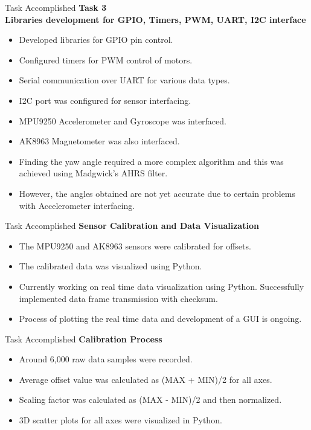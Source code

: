 \documentclass[10pt, a4paper]{beamer}
\begin{document}
\begin{frame}{Task Accomplished}
\bfseries Task 3\\ Libraries development for GPIO, Timers, PWM, UART, I2C interface\\
\mdseries 
\begin{itemize} 
\item Developed libraries for GPIO pin control.\\
\item Configured timers for PWM control of motors.\\
\item Serial communication over UART for various data types.\\
\item I2C port was configured for sensor interfacing.\\
\item MPU9250 Accelerometer and Gyroscope was interfaced.\\ 
\item AK8963 Magnetometer was also interfaced.\\ 
\item Finding the yaw angle required a more complex algorithm and this was achieved using Madgwick's AHRS filter. 
\item However, the angles obtained are not yet accurate due to certain problems with Accelerometer interfacing.
\end{itemize}
\end{frame}

\begin{frame}{Task Accomplished}
\bfseries Sensor Calibration and Data Visualization\\ \hfill \break
\mdseries 
\begin{itemize} 
\item The MPU9250 and AK8963 sensors were calibrated for offsets. 
\item The calibrated data was visualized using Python. 
\item Currently working on real time data visualization using Python. Successfully implemented data frame transmission with checksum. 
\item Process of plotting the real time data and development of a GUI is ongoing.
\end{itemize}
\end{frame}

\begin{frame}{Task Accomplished}
\bfseries Calibration Process\\ \hfill \break
\mdseries 
\begin{itemize} 
\item Around 6,000 raw data samples were recorded.
\item Average offset value was calculated as (MAX + MIN)/2 for all axes.
\item Scaling factor was calculated as (MAX - MIN)/2 and then normalized.
\item 3D scatter plots for all axes were visualized in Python.
\end{itemize}
\end{frame}
\end{document}
